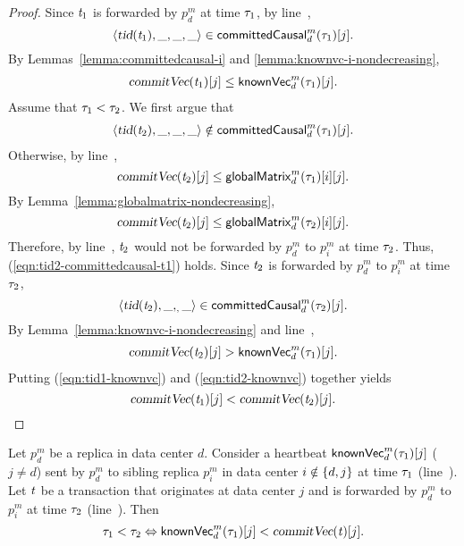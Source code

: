 \begin{proof} \label{proof:forwarding-order}
  Since $\mathit{t}_{1}$ is forwarded by $p^{m}_{d}$ at time $\tau_{1}$,
  by line~\code{\ref{alg:unistore-replication}}{\ref{line:forward-txs}},
  \[
    \langle \textsl{tid}(\mathit{t}_{1}), \_, \_, \_ \rangle \in {\sf committedCausal}^{m}_{d}(\tau_{1})[j].
  \]
  By Lemmas~\ref{lemma:committedcausal-i} and \ref{lemma:knownvc-i-nondecreasing},
  \begin{align}
    \textsl{commitVec}(\mathit{t}_{1})[j] \le {\sf knownVec}^{m}_{d}(\tau_{1})[j].
    \label{eqn:tid1-knownvc}
  \end{align}
  Assume that $\tau_{1} < \tau_{2}$.
  We first argue that
  \begin{align}
    \langle \textsl{tid}(\mathit{t}_{2}), \_, \_, \_ \rangle \notin {\sf committedCausal}^{m}_{d}(\tau_{1})[j].
    \label{eqn:tid2-committedcausal-t1}
  \end{align}
  Otherwise, by line~\code{\ref{alg:unistore-replication}}{\ref{line:forward-txs}},
  \[
    \textsl{commitVec}(\mathit{t}_{2})[j] \le {\sf globalMatrix}^{m}_{d}(\tau_{1})[i][j].
  \]
  By Lemma~\ref{lemma:globalmatrix-nondecreasing},
  \[
    \textsl{commitVec}(\mathit{t}_{2})[j] \le {\sf globalMatrix}^{m}_{d}(\tau_{2})[i][j].
  \]
  Therefore, by line~\code{\ref{alg:unistore-replication}}{\ref{line:forward-txs}},
  $\mathit{t}_{2}$ would not be forwarded by $p^{m}_{d}$ to $p^{m}_{i}$ at time $\tau_{2}$.
  Thus, (\ref{eqn:tid2-committedcausal-t1}) holds.
  Since $\mathit{t}_{2}$ is forwarded by $p^{m}_{d}$ to $p^{m}_{i}$ at time $\tau_{2}$,
  \[
    \langle \textsl{tid}(\mathit{t}_{2}), \_, _, \_ \rangle \in {\sf committedCausal}^{m}_{d}(\tau_{2})[j].
  \]
  By Lemma~\ref{lemma:knownvc-i-nondecreasing}
  and line~\code{\ref{alg:unistore-replication}}{\ref{line:replicate-precondition}},
  \begin{align}
    \textsl{commitVec}(\mathit{t}_{2})[j] > {\sf knownVec}^{m}_{d}(\tau_{1})[j].
    \label{eqn:tid2-knownvc}
  \end{align}
  Putting (\ref{eqn:tid1-knownvc}) and (\ref{eqn:tid2-knownvc}) together yields
  \[
    \textsl{commitVec}(\mathit{t}_{1})[j] < \textsl{commitVec}(\mathit{t}_{2})[j].
  \]
\end{proof}

\begin{applemma} \label{lemma:heartbeat-forwarding-order}
  Let $p^{m}_{d}$ be a replica in data center $d$.
  Consider a heartbeat ${\sf knownVec}^{m}_{d}(\tau_{1})[j]$ ($j \neq d$)
  sent by $p^{m}_{d}$ to sibling replica $p^{m}_{i}$
  in data center $i \notin \{d, j\}$ at time $\tau_{1}$
  (line~\code{\ref{alg:unistore-replication}}{\ref{line:forward-call-heartbeat}}).
  Let $\mathit{t}$ be a transaction that originates at data center $j$
  and is forwarded by $p^{m}_{d}$ to $p^{m}_{i}$ at time $\tau_{2}$
  (line~\code{\ref{alg:unistore-replication}}{\ref{line:forward-call-replicate}}).
  Then
  \[
    \tau_{1} < \tau_{2} \Leftrightarrow {\sf knownVec}^{m}_{d}(\tau_{1})[j] < \textsl{commitVec}(\mathit{t})[j].
  \]
\end{applemma}


